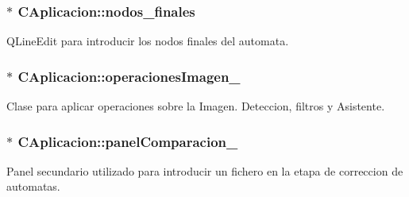 \subsubsection[{\texorpdfstring{nodos\+\_\+finales}{nodos_finales}}]{$\ast$ C\+Aplicacion\+::nodos\+\_\+finales\hspace{0.3cm}{\ttfamily [private]}}\hypertarget{classCAplicacion_a483026f954a5a26ddd9ded5863c61b9a}{}\label{classCAplicacion_a483026f954a5a26ddd9ded5863c61b9a}


Q\+Line\+Edit para introducir los nodos finales del automata. 

\subsubsection[{\texorpdfstring{operaciones\+Imagen\+\_\+}{operacionesImagen_}}]{$\ast$ C\+Aplicacion\+::operaciones\+Imagen\+\_\+\hspace{0.3cm}{\ttfamily [private]}}\hypertarget{classCAplicacion_a58596bdd1d1e018bcb8bd58b64de538e}{}\label{classCAplicacion_a58596bdd1d1e018bcb8bd58b64de538e}


Clase para aplicar operaciones sobre la Imagen. Deteccion, filtros y Asistente. 

\subsubsection[{\texorpdfstring{panel\+Comparacion\+\_\+}{panelComparacion_}}]{$\ast$ C\+Aplicacion\+::panel\+Comparacion\+\_\+\hspace{0.3cm}{\ttfamily [private]}}\hypertarget{classCAplicacion_a16f1c9d4fd9168f0787c210588a048be}{}\label{classCAplicacion_a16f1c9d4fd9168f0787c210588a048be}


Panel secundario utilizado para introducir un fichero en la etapa de correccion de automatas. 

